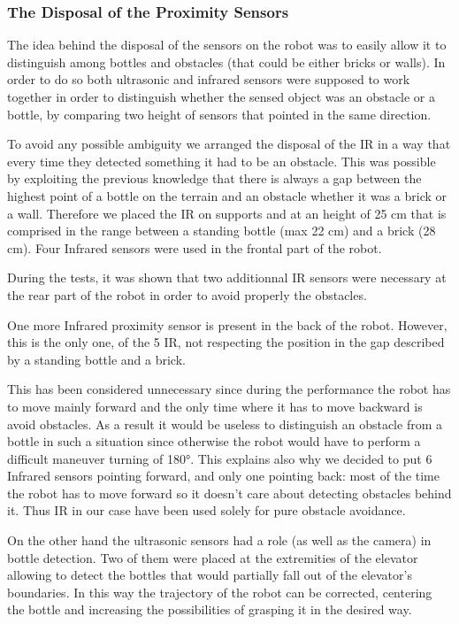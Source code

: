 \subsubsection{The Disposal of the Proximity Sensors}

The idea behind the disposal of the sensors on the robot was to easily allow it to distinguish among bottles and obstacles (that could be either bricks or walls). In order to do so both ultrasonic and infrared sensors were supposed to work together in order to distinguish whether the sensed object was an obstacle or a bottle, by comparing two height of sensors that pointed in the same direction.

To avoid any possible ambiguity we arranged the disposal of the IR in a way that every time they detected something it had to be an obstacle.
This was possible by exploiting the previous knowledge that there is always a gap between the highest point of a bottle on the terrain and an obstacle whether it was a brick or a wall.
Therefore we placed the IR on supports and at an height of 25 cm that is comprised in the range between a standing bottle (max 22 cm) and a brick (28 cm).
Four Infrared sensors were used in the frontal part of the robot.

During the tests, it was shown that two additionnal IR sensors were necessary at the rear part of the robot in order to avoid properly the obstacles.

One more Infrared proximity sensor is present in the back of the robot.
However, this is the only one, of the 5 IR, not respecting the position in the gap described by a standing bottle and a brick.

This has been considered unnecessary since during the performance the robot has to move mainly forward and the only time where it has to move backward is avoid obstacles. As a result it would be useless to distinguish an obstacle from a bottle in such a situation since otherwise the robot would have to perform a difficult maneuver turning of 180°.
This explains also why we decided to put 6 Infrared sensors pointing forward, and only one pointing back: most of the time the robot has to move forward so it doesn’t care about detecting obstacles behind it.
Thus IR in our case have been used solely for pure obstacle avoidance.

On the other hand the ultrasonic sensors had a role (as well as the camera) in bottle detection.
Two of them were placed at the extremities of the elevator allowing to detect the bottles that would partially fall out of the elevator's boundaries. In this way the trajectory of the robot can be corrected, centering the bottle and increasing the possibilities of grasping it in the desired way.

